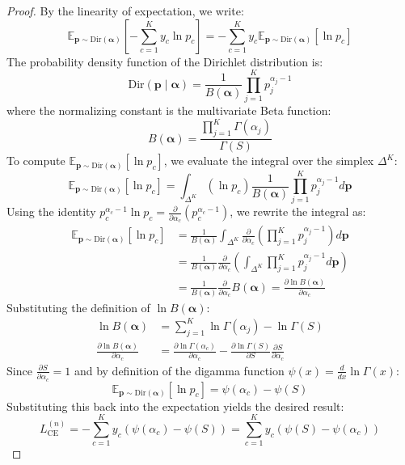 \documentclass[letterpaper]{article} %
\newcommand{\Dir}{\text{Dir}}
\begin{document}
\begin{proof}
By the linearity of expectation, we write:
\begin{equation}
    \mathbb{E}_{\bm{p} \sim \Dir(\bm{\alpha})} \left[ -\sum_{c=1}^K y_c \ln p_c \right] = -\sum_{c=1}^K y_c \mathbb{E}_{\bm{p} \sim \Dir(\bm{\alpha})} \left[ \ln p_c \right]
\end{equation}
The probability density function of the Dirichlet distribution is:
\begin{equation}
    \Dir(\bm{p} \mid \bm{\alpha}) = \frac{1}{B(\bm{\alpha})} \prod_{j=1}^K p_j^{\alpha_j - 1}
\end{equation}
where the normalizing constant is the multivariate Beta function:
\begin{equation}
    B(\bm{\alpha}) = \frac{\prod_{j=1}^K \Gamma(\alpha_j)}{\Gamma(S)}
\end{equation}
To compute $\mathbb{E}_{\bm{p} \sim \Dir(\bm{\alpha})} \left[ \ln p_c \right]$, we evaluate the integral over the simplex $\Delta^K$:
\begin{equation}
    \mathbb{E}_{\bm{p} \sim \Dir(\bm{\alpha})} \left[ \ln p_c \right] = \int_{\Delta^K} (\ln p_c) \frac{1}{B(\bm{\alpha})} \prod_{j=1}^K p_j^{\alpha_j - 1} d\bm{p}
\end{equation}
Using the identity $p_c^{\alpha_c - 1} \ln p_c = \frac{\partial}{\partial \alpha_c} \left( p_c^{\alpha_c - 1} \right)$, we rewrite the integral as:
\begin{align}
    \mathbb{E}_{\bm{p} \sim \Dir(\bm{\alpha})} \left[ \ln p_c \right] &= \frac{1}{B(\bm{\alpha})} \int_{\Delta^K} \frac{\partial}{\partial \alpha_c} \left( \prod_{j=1}^K p_j^{\alpha_j - 1} \right) d\bm{p} \\
    &= \frac{1}{B(\bm{\alpha})} \frac{\partial}{\partial \alpha_c} \left( \int_{\Delta^K} \prod_{j=1}^K p_j^{\alpha_j - 1} d\bm{p} \right) \\
    &= \frac{1}{B(\bm{\alpha})} \frac{\partial}{\partial \alpha_c} B(\bm{\alpha}) = \frac{\partial \ln B(\bm{\alpha})}{\partial \alpha_c}
\end{align}
Substituting the definition of $\ln B(\bm{\alpha})$:
\begin{align}
    \ln B(\bm{\alpha}) &= \sum_{j=1}^K \ln \Gamma(\alpha_j) - \ln \Gamma(S) \\
    \frac{\partial \ln B(\bm{\alpha})}{\partial \alpha_c} &= \frac{\partial \ln \Gamma(\alpha_c)}{\partial \alpha_c} - \frac{\partial \ln \Gamma(S)}{\partial S} \frac{\partial S}{\partial \alpha_c}
\end{align}
Since $\frac{\partial S}{\partial \alpha_c} = 1$ and by definition of the digamma function $\psi(x) = \frac{d}{dx} \ln \Gamma(x)$:
\begin{equation}
    \mathbb{E}_{\bm{p} \sim \Dir(\bm{\alpha})} \left[ \ln p_c \right] = \psi(\alpha_c) - \psi(S)
\end{equation}
Substituting this back into the expectation yields the desired result:
\begin{equation}
    L_{\text{CE}}^{(n)} = -\sum_{c=1}^K y_c \left( \psi(\alpha_c) - \psi(S) \right) = \sum_{c=1}^K y_c \left( \psi(S) - \psi(\alpha_c) \right)
\end{equation}
\end{proof}
\end{document}
